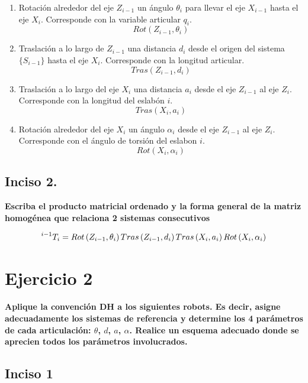 \documentclass[a4paper,12pt]{article}
\begin{document}
\begin{enumerate}
    \item Rotación alrededor del eje $Z_{i-1}$ un ángulo $\theta_i$ para llevar el eje $X_{i-1}$ hasta el eje $X_i$. Corresponde con la variable articular $q_i$.
    \[Rot\left(Z_{i-1}, \theta_i\right)\]
    \item Traslación a lo largo de $Z_{i-1}$ una distancia $d_i$ desde el origen del sistema $\{S_{i-1}\}$ hasta el eje $X_i$. Corresponde con la longitud articular.
    \[Tras\left(Z_{i-1}, d_i\right)\]
    \item Traslación a lo largo del eje $X_i$ una distancia $a_i$ desde el eje $Z_{i-1}$ al eje $Z_{i}$. Corresponde con la longitud del eslabón $i$.
    \[Tras\left(X_{i}, a_i\right)\]
    \item Rotación alrededor del eje $X_{i}$ un ángulo $\alpha_i$ desde el eje $Z_{i-1}$ al eje $Z_{i}$. Corresponde con el ángulo de torsión del eslabon $i$.
    \[Rot\left(X_{i}, \alpha_i\right)\]
\end{enumerate}

\subsection{Inciso 2.}
\textbf{Escriba el producto matricial ordenado y la forma general de la matriz homogénea
que relaciona 2 sistemas consecutivos}

\[\prescript{i-1}{}{T_i} = Rot\left(Z_{i-1}, \theta_i\right) Tras\left(Z_{i-1}, d_i\right) Tras\left(X_{i}, a_i\right) Rot\left(X_{i}, \alpha_i\right)\]

\section{Ejercicio 2}
\textbf{Aplique la convención DH a los siguientes robots. Es decir, asigne adecuadamente
los sistemas de referencia y determine los 4 parámetros de cada articulación: $\theta$, $d$, $a$, $\alpha$. Realice
un esquema adecuado donde se aprecien todos los parámetros involucrados.}

\subsection{Inciso 1}
\end{document}
